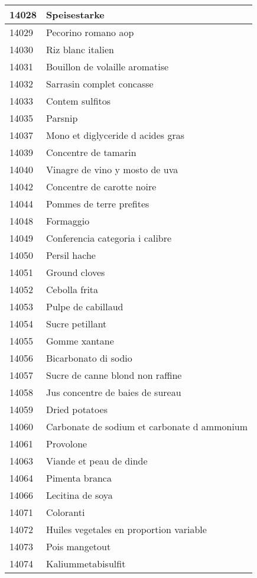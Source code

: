 \begin{longtable}{|l|l|}
14028 & Speisestarke \\ \hline 
14029 & Pecorino romano aop \\ \hline 
14030 & Riz blanc italien \\ \hline 
14031 & Bouillon de volaille aromatise \\ \hline 
14032 & Sarrasin complet concasse \\ \hline 
14033 & Contem sulfitos \\ \hline 
14035 & Parsnip \\ \hline 
14037 & Mono et diglyceride d acides gras \\ \hline 
14039 & Concentre de tamarin \\ \hline 
14040 & Vinagre de vino y mosto de uva \\ \hline 
14042 & Concentre de carotte noire \\ \hline 
14044 & Pommes de terre prefites \\ \hline 
14048 & Formaggio \\ \hline 
14049 & Conferencia categoria i calibre \\ \hline 
14050 & Persil hache \\ \hline 
14051 & Ground cloves \\ \hline 
14052 & Cebolla frita \\ \hline 
14053 & Pulpe de cabillaud \\ \hline 
14054 & Sucre petillant \\ \hline 
14055 & Gomme xantane \\ \hline 
14056 & Bicarbonato di sodio \\ \hline 
14057 & Sucre de canne blond non raffine \\ \hline 
14058 & Jus concentre de baies de sureau \\ \hline 
14059 & Dried potatoes \\ \hline 
14060 & Carbonate de sodium et carbonate d ammonium \\ \hline 
14061 & Provolone \\ \hline 
14063 & Viande et peau de dinde \\ \hline 
14064 & Pimenta branca \\ \hline 
14066 & Lecitina de soya \\ \hline 
14071 & Coloranti \\ \hline 
14072 & Huiles vegetales en proportion variable \\ \hline 
14073 & Pois mangetout \\ \hline 
14074 & Kaliummetabisulfit \\ \hline 

\end{longtable}
